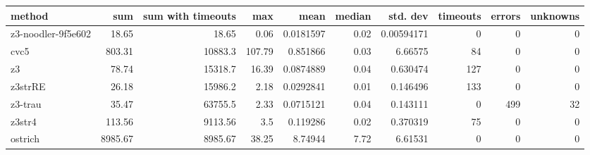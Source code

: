 \begin{tabular}{lrrrrrrrrr}
\hline
 method             &     sum &   sum with timeouts &    max &      mean &   median &   std. dev &   timeouts &   errors &   unknowns \\
\hline
 z3-noodler-9f5e602 &   18.65 &               18.65 &   0.06 & 0.0181597 &     0.02 & 0.00594171 &          0 &        0 &          0 \\
 cvc5               &  803.31 &            10883.3  & 107.79 & 0.851866  &     0.03 & 6.66575    &         84 &        0 &          0 \\
 z3                 &   78.74 &            15318.7  &  16.39 & 0.0874889 &     0.04 & 0.630474   &        127 &        0 &          0 \\
 z3strRE            &   26.18 &            15986.2  &   2.18 & 0.0292841 &     0.01 & 0.146496   &        133 &        0 &          0 \\
 z3-trau            &   35.47 &            63755.5  &   2.33 & 0.0715121 &     0.04 & 0.143111   &          0 &      499 &         32 \\
 z3str4             &  113.56 &             9113.56 &   3.5  & 0.119286  &     0.02 & 0.370319   &         75 &        0 &          0 \\
 ostrich            & 8985.67 &             8985.67 &  38.25 & 8.74944   &     7.72 & 6.61531    &          0 &        0 &          0 \\
\hline
\end{tabular}
